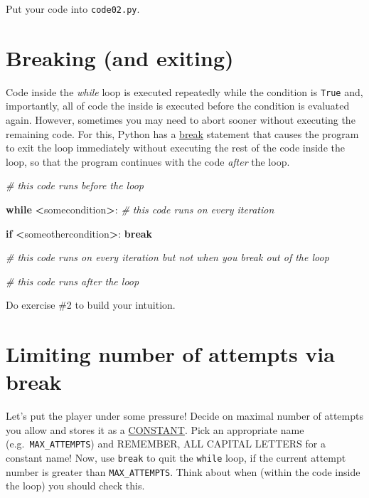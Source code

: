 \documentclass[
]{book}
\newenvironment{Shaded}{\begin{snugshade}}{\end{snugshade}}
\newcommand{\CommentTok}[1]{\textcolor[rgb]{0.56,0.35,0.01}{\textit{#1}}}
\newcommand{\ControlFlowTok}[1]{\textcolor[rgb]{0.13,0.29,0.53}{\textbf{#1}}}
\newcommand{\NormalTok}[1]{#1}
\newcommand{\OperatorTok}[1]{\textcolor[rgb]{0.81,0.36,0.00}{\textbf{#1}}}
\begin{document}
Put your code into \texttt{code02.py}.

\hypertarget{break}{%
\section{Breaking (and exiting)}\label{break}}

Code inside the \emph{while} loop is executed repeatedly while the condition is \texttt{True} and, importantly, all of code the inside is executed before the condition is evaluated again. However, sometimes you may need to abort sooner without executing the remaining code. For this, Python has a \href{https://docs.python.org/3/tutorial/controlflow.html\#break-and-continue-statements-and-else-clauses-on-loops}{break} statement that causes the program to exit the loop immediately without executing the rest of the code inside the loop, so that the program continues with the code \emph{after} the loop.

\begin{Shaded}
\begin{Highlighting}[]
\CommentTok{\# this code runs before the loop}

\ControlFlowTok{while} \OperatorTok{\textless{}}\NormalTok{somecondition}\OperatorTok{\textgreater{}}\NormalTok{:}
  \CommentTok{\# this code runs on every iteration}
  
    \ControlFlowTok{if} \OperatorTok{\textless{}}\NormalTok{someothercondition}\OperatorTok{\textgreater{}}\NormalTok{:}
        \ControlFlowTok{break}
  
  \CommentTok{\# this code runs on every iteration but not when you break out of the loop}

\CommentTok{\# this code runs after the loop}
\end{Highlighting}
\end{Shaded}

Do exercise \#2 to build your intuition.

\hypertarget{limiting-number-of-attempts-via-break}{%
\section{Limiting number of attempts via break}\label{limiting-number-of-attempts-via-break}}

Let's put the player under some pressure! Decide on maximal number of attempts you allow and stores it as a \protect\hyperlink{constants}{CONSTANT}. Pick an appropriate name (e.g.~\texttt{MAX\_ATTEMPTS}) and REMEMBER, ALL CAPITAL LETTERS for a constant name! Now, use \texttt{break} to quit the \texttt{while} loop, if the current attempt number is greater than \texttt{MAX\_ATTEMPTS}. Think about when (within the code inside the loop) you should check this.
\end{document}
